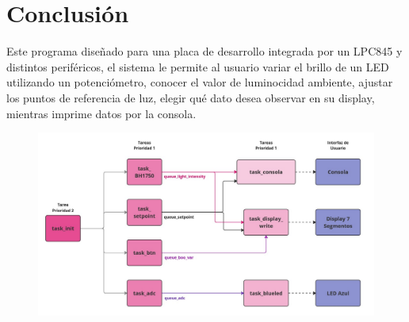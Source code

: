 \documentclass[conference]{IEEEtran}
\begin{document}
    \section{Conclusión}
        Este programa diseñado para una placa de desarrollo integrada por un LPC845 y distintos periféricos, el sistema le permite al usuario variar el brillo de un LED utilizando un potenciómetro, conocer el valor de luminocidad ambiente, ajustar los puntos de referencia de luz, elegir qué dato desea observar en su display, mientras imprime datos por la consola.\par

    \clearpage

    \begin{figure} [!ht]
        \centering
        \includegraphics[width=\textheight, angle=90]{Diagrama de flujo_ProyectoIntegador.pdf}
        \label{fig:1}
    \end{figure}
\end{document}
